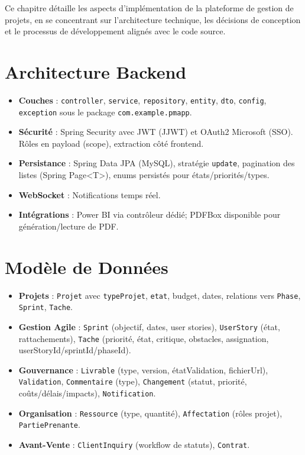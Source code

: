Ce chapitre détaille les aspects d'implémentation de la plateforme de gestion de projets, en se concentrant sur l'architecture technique, les décisions de conception et le processus de développement alignés avec le code source.

\section{Architecture Backend}
\begin{itemize}
  \item \textbf{Couches} : \texttt{controller}, \texttt{service}, \texttt{repository}, \texttt{entity}, \texttt{dto}, \texttt{config}, \texttt{exception} sous le package \texttt{com.example.pmapp}.
  \item \textbf{Sécurité} : Spring Security avec JWT (JJWT) et OAuth2 Microsoft (SSO). Rôles en payload (scope), extraction côté frontend.
  \item \textbf{Persistance} : Spring Data JPA (MySQL), stratégie \texttt{update}, pagination des listes (Spring Page<T>), enums persistés pour états/priorités/types.
  \item \textbf{WebSocket} : Notifications temps réel.
  \item \textbf{Intégrations} : Power BI via contrôleur dédié; PDFBox disponible pour génération/lecture de PDF.
\end{itemize}

\section{Modèle de Données}
\begin{itemize}
  \item \textbf{Projets} : \texttt{Projet} avec \texttt{typeProjet}, \texttt{etat}, budget, dates, relations vers \texttt{Phase}, \texttt{Sprint}, \texttt{Tache}.
  \item \textbf{Gestion Agile} : \texttt{Sprint} (objectif, dates, user stories), \texttt{UserStory} (état, rattachements), \texttt{Tache} (priorité, état, critique, obstacles, assignation, userStoryId/sprintId/phaseId).
  \item \textbf{Gouvernance} : \texttt{Livrable} (type, version, étatValidation, fichierUrl), \texttt{Validation}, \texttt{Commentaire} (type), \texttt{Changement} (statut, priorité, coûts/délais/impacts), \texttt{Notification}.
  \item \textbf{Organisation} : \texttt{Ressource} (type, quantité), \texttt{Affectation} (rôles projet), \texttt{PartiePrenante}.
  \item \textbf{Avant-Vente} : \texttt{ClientInquiry} (workflow de statuts), \texttt{Contrat}.
\end{itemize}

